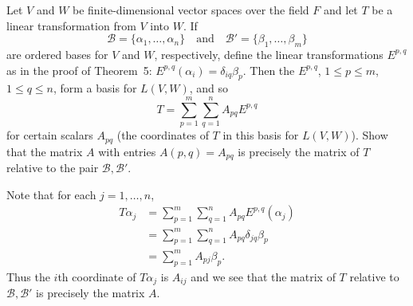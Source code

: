  Let $V$ and $W$ be finite-dimensional vector spaces over
the field $F$ and let $T$ be a linear transformation from $V$ into
$W$. If
\begin{equation*}
  \mathcal{B} = \{\alpha_1,\dots,\alpha_n\}
  \quad\text{and}\quad
  \mathcal{B}' = \{\beta_1,\dots,\beta_m\}
\end{equation*}
are ordered bases for $V$ and $W$, respectively, define the linear
transformations $E^{p,q}$ as in the proof of Theorem~5:
$E^{p,q}(\alpha_i) = \delta_{iq}\beta_p$. Then the $E^{p,q}$,
$1\leq p\leq m$, $1\leq q\leq n$, form a basis for $L(V,W)$, and so
\begin{equation*}
  T = \sum_{p=1}^m\sum_{q=1}^nA_{pq}E^{p,q}
\end{equation*}
for certain scalars $A_{pq}$ (the coordinates of $T$ in this basis for
$L(V,W)$). Show that the matrix $A$ with entries $A(p,q) = A_{pq}$ is
precisely the matrix of $T$ relative to the pair
$\mathcal{B},\mathcal{B}'$.
\begin{solution}
  Note that for each $j = 1,\dots,n$,
  \begin{align*}
    T\alpha_j
    &= \sum_{p=1}^m\sum_{q=1}^nA_{pq}E^{p,q}(\alpha_j) \\
    &= \sum_{p=1}^m\sum_{q=1}^nA_{pq}\delta_{jq}\beta_p \\
    &= \sum_{p=1}^mA_{pj}\beta_p.
  \end{align*}
  Thus the $i$th coordinate of $T\alpha_j$ is $A_{ij}$ and we see that
  the matrix of $T$ relative to $\mathcal{B},\mathcal{B}'$ is
  precisely the matrix $A$.
\end{solution}
